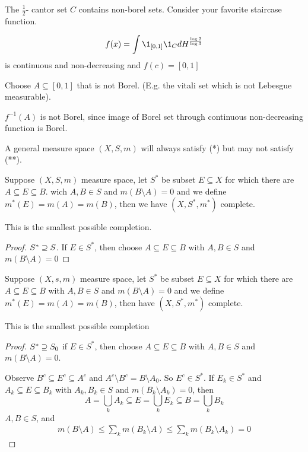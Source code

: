 \begin{example}
	The $\frac{1}{2}$- cantor set $C$ contains non-borel sets.
	Consider your favorite staircase function.

	\[
		f(x) = \int \1_{[0,1]}\1_{C} dH^{\frac{\log{2}}{\log{3}}}
	\] 
	is continuous and non-decreasing and $f(c) = [0,1]$
\end{example}

Choose $A \subseteq [0,1]$ that is not Borel. (E.g. the vitali set which is not Lebesgue measurable).

$f^{-1} (A)$ is not Borel, since image of Borel set through continuous non-decreasing function is Borel.


\begin{remark}
	A general measure space $(X, S, m)$ will always satisfy (*) but may not satisfy  (**).
\end{remark}

\begin{theorem}
	Suppose $(X,S, m)$ measure space, let $S^*$ be subset $E \subseteq X$ for which there are $A \subseteq E \subseteq B$.
	wich $A,B \in S$ and $m(B \setminus A) = 0$ and we define  $m^*(E) = m(A) = m(B)$, then we have $(X,S^*, m^*)$ complete.
\end{theorem}

\begin{remark}
	This is the smallest possible completion.
\end{remark}

\begin{proof}
	$S^* \supseteq S$. If $E \in S^*$, then choose $A \subseteq E \subseteq B$ with $A,B \in S$ and $m(B \setminus A) = 0$
\end{proof}

\begin{theorem}
	Suppose $(X,s, m)$ measure space, let $S^*$ be subset $E \subseteq X$ for which there are $A \subseteq E \subseteq B$ with 
	$A, B \in S$ and $m(B \setminus A) = 0$ and we define  $m^*(E) = m(A) = m(B)$, then have $(X,S^*, m^*)$ complete.
\end{theorem}

\begin{remark}
	This is the smallest possible completion
\end{remark}

\begin{proof}
	$S^* \supseteq S_0$ if $E \in S^*$, then choose $A \subseteq E \subseteq B$ with $A,B \in S$ and  $m(B \setminus A) = 0$.

	Observe  $B^c \subseteq E^c \subseteq A^c$ and $A^c \setminus B^c = B \setminus A_0$. So
	 $E^c \in S^*$. If $E_k \in S^*$ and $A_k \subseteq E \subseteq B_k$ with $A_k, B_k \in S$ and $m(B_k \setminus A_k) = 0$, 
	 then
	 \[
		 A = \bigcup_{k} A_k \subseteq 
		 E = \bigcup_{k} E_k \subseteq 
		 B = \bigcup_{k} B_k
	 \] 
	 $A,B \in S$, and
	 \begin{align*}
		 m(B \setminus A) \leq \sum_{k} m(B_{k} \setminus A) \leq \sum_{k} m(B_{k} \setminus A_k) = 0
	 \end{align*}
\end{proof}

